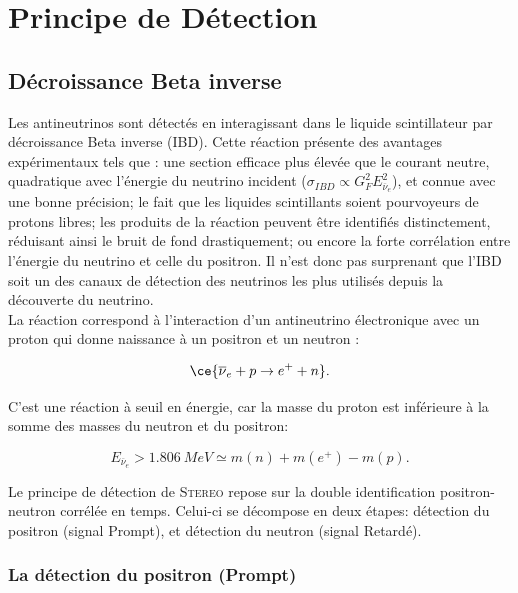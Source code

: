 \bigbreak 


\section{Principe de Détection} 

\subsection{Décroissance Beta inverse} 

Les antineutrinos sont détectés en interagissant dans le liquide scintillateur par décroissance Beta inverse (IBD). Cette réaction présente des avantages expérimentaux tels que : une section efficace plus élevée que le courant neutre, quadratique avec l'énergie du neutrino incident ($\sigma_{IBD} \propto G_F^2E_{\overline{\nu}_e}^2$), et connue avec une bonne précision; le fait que les liquides scintillants soient pourvoyeurs de protons libres; les produits de la réaction peuvent être identifiés distinctement, réduisant ainsi le bruit de fond drastiquement; ou encore la forte corrélation entre l'énergie du neutrino et celle du positron. Il n'est donc pas surprenant que l'IBD soit un des canaux de détection des neutrinos les plus utilisés depuis la découverte du neutrino.\\ 

La réaction correspond à l'interaction d'un antineutrino électronique avec un proton qui donne naissance à un positron et un neutron : 

\begin{equation} 
\ce{\overline{\nu}_e + p \rightarrow e^+ + n}. 
\end{equation} 

\bigbreak 

C'est une réaction à seuil en énergie, car la masse du proton est inférieure à la somme des masses du neutron et du positron: 

\begin{equation} 
E_{\overline{\nu}_e} > \SI{1.806}{MeV} \simeq m(n) + m(e^+) - m(p). 
\end{equation} 

\bigbreak 

Le principe de détection de \textsc{Stereo} repose sur la double identification positron-neutron corrélée en temps. Celui-ci se décompose en deux étapes: détection du positron (signal Prompt), et détection du neutron (signal Retardé). 

\bigbreak 

\subsubsection*{La détection du positron (Prompt)} 

